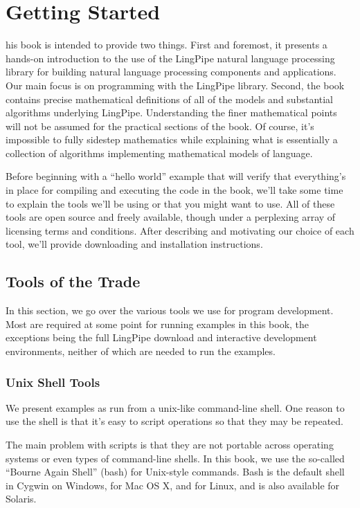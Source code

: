 \chapter{Getting Started}

his book is intended to provide two things.  First and
foremost, it presents a hands-on introduction to the use of the
LingPipe natural language processing library for building natural
language processing components and applications.  Our main focus is on
programming with the LingPipe library.  Second, the book contains
precise mathematical definitions of all of the models and substantial
algorithms underlying LingPipe.  Understanding the finer mathematical
points will not be assumed for the practical sections of the book.  Of
course, it's impossible to fully sidestep mathematics while explaining
what is essentially a collection of algorithms implementing mathematical
models of language.

Before beginning with a ``hello world'' example that will verify that
everything's in place for compiling and executing the code in the
book, we'll take some time to explain the tools we'll be using or that
you might want to use.  All of these tools are open source and freely
available, though under a perplexing array of licensing terms and
conditions.  After describing and motivating our choice of each tool,
we'll provide downloading and installation instructions.

\section{Tools of the Trade}

In this section, we go over the various tools we use for program
development.  Most are required at some point for running examples
in this book, the exceptions being the full LingPipe download and
interactive development environments, neither of which are needed
to run the examples.


\subsection{Unix Shell Tools}

We present examples as run from a unix-like command-line shell.
One reason to use the shell is that it's easy to script operations so
that they may be repeated.  

The main problem with scripts is that they are not portable across
operating systems or even types of command-line shells.  In this book,
we use the so-called ``Bourne Again Shell'' (bash) for Unix-style
commands.  Bash is the default shell in Cygwin on Windows, for Mac OS
X, and for Linux, and is also available for Solaris.

